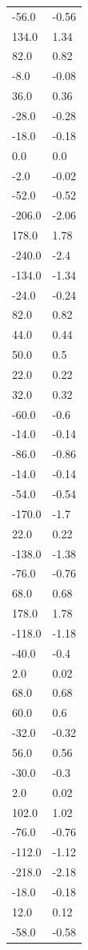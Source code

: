 \begin{longtable}{ll}
-56.0 & -0.56 \\
134.0 & 1.34 \\
82.0 & 0.82 \\
-8.0 & -0.08 \\
36.0 & 0.36 \\
-28.0 & -0.28 \\
-18.0 & -0.18 \\
0.0 & 0.0 \\
-2.0 & -0.02 \\
-52.0 & -0.52 \\
-206.0 & -2.06 \\
178.0 & 1.78 \\
-240.0 & -2.4 \\
-134.0 & -1.34 \\
-24.0 & -0.24 \\
82.0 & 0.82 \\
44.0 & 0.44 \\
50.0 & 0.5 \\
22.0 & 0.22 \\
32.0 & 0.32 \\
-60.0 & -0.6 \\
-14.0 & -0.14 \\
-86.0 & -0.86 \\
-14.0 & -0.14 \\
-54.0 & -0.54 \\
-170.0 & -1.7 \\
22.0 & 0.22 \\
-138.0 & -1.38 \\
-76.0 & -0.76 \\
68.0 & 0.68 \\
178.0 & 1.78 \\
-118.0 & -1.18 \\
-40.0 & -0.4 \\
2.0 & 0.02 \\
68.0 & 0.68 \\
60.0 & 0.6 \\
-32.0 & -0.32 \\
56.0 & 0.56 \\
-30.0 & -0.3 \\
2.0 & 0.02 \\
102.0 & 1.02 \\
-76.0 & -0.76 \\
-112.0 & -1.12 \\
-218.0 & -2.18 \\
-18.0 & -0.18 \\
12.0 & 0.12 \\
-58.0 & -0.58 \\

\end{longtable}
